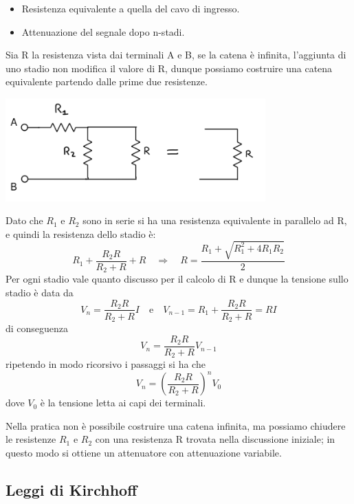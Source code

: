 \begin{itemize}
	\item Resistenza equivalente a quella del cavo di ingresso.
	\item Attenuazione del segnale dopo n-stadi.
\end{itemize}

Sia R la resistenza vista dai terminali A e B, se la catena \`e infinita, l'aggiunta di uno stadio non modifica il valore di R, dunque possiamo costruire una catena equivalente partendo dalle prime due resistenze.
\begin{center}
	\includegraphics[width = 10cm]{images/redux3}
\end{center} 
 Dato che $R_1$ e $R_{2}$ sono in serie si ha una resistenza equivalente in parallelo ad R, e quindi la resistenza dello stadio \`e:
 \begin{equation*}
 	R_1 + \frac{R_2 R}{R_2 + R} + R \quad \Rightarrow \quad R = \frac{R_{1} + \sqrt{R_1^2 + 4R_{1}R_{2}}}{2}
 \end{equation*}
 Per ogni stadio vale quanto discusso per il calcolo di R e dunque la tensione sullo stadio \`e data da
 \begin{equation*}
 	V_{n} = \frac{R_{2}R}{R_{2} +R}I  \quad \text{e} \quad V_{n-1} = R_{1} + \frac{R_2R}{R_{2}+R} =R I
 \end{equation*}
di conseguenza
\begin{equation*}
	V_{n} = \frac{R_2R}{R_{2} + R}V_{n-1}
\end{equation*}
ripetendo in modo ricorsivo i passaggi si ha che 
\begin{equation*}
	V_{n} = \left(\frac{R_{2}R}{R_{2} + R}\right)^nV_{0}
\end{equation*}
dove $V_{0}$ \`e la tensione letta ai capi dei terminali.
 
 Nella pratica non \`e possibile costruire una catena infinita, ma possiamo chiudere le resistenze $R_{1}$ e $R_{2}$ con una resistenza R trovata nella discussione iniziale; in questo modo si ottiene un attenuatore con attenuazione variabile.
 
 \subsection{Leggi di Kirchhoff}
 
